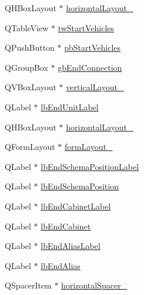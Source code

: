 \begin{DoxyCompactItemize}
\item 
Q\-H\-Box\-Layout $\ast$ \hyperlink{class_ui__mdt_cl_unit_link_dialog_a83f86965ec189685c8fa610371be4cdf}{horizontal\-Layout\-\_}
\item 
Q\-Table\-View $\ast$ \hyperlink{class_ui__mdt_cl_unit_link_dialog_a1a12761bd3b7fb3d574e790013e29267}{tw\-Start\-Vehicles}
\item 
Q\-Push\-Button $\ast$ \hyperlink{class_ui__mdt_cl_unit_link_dialog_a76e41cf9a2d85ea9ad0e15d3f0f4ed91}{pb\-Start\-Vehicles}
\item 
Q\-Group\-Box $\ast$ \hyperlink{class_ui__mdt_cl_unit_link_dialog_a5e6c24c5ad56b20b8289749c906ccc65}{gb\-End\-Connection}
\item 
Q\-V\-Box\-Layout $\ast$ \hyperlink{class_ui__mdt_cl_unit_link_dialog_a8b2ec4702b83c9892c0b1feff9513c28}{vertical\-Layout\-\_}
\item 
Q\-Label $\ast$ \hyperlink{class_ui__mdt_cl_unit_link_dialog_a4bbab7bc9ce1d4b4e04ae075a2e08a43}{lb\-End\-Unit\-Label}
\item 
Q\-H\-Box\-Layout $\ast$ \hyperlink{class_ui__mdt_cl_unit_link_dialog_a1e7a1e276f9f01e0f25f46d7bfe7e8f9}{horizontal\-Layout\-\_}
\item 
Q\-Form\-Layout $\ast$ \hyperlink{class_ui__mdt_cl_unit_link_dialog_afbcb186f7a974287674edfccdbbb06b3}{form\-Layout\-\_}
\item 
Q\-Label $\ast$ \hyperlink{class_ui__mdt_cl_unit_link_dialog_a3c5c9794fa6c0ecdc61860ed39525f81}{lb\-End\-Schema\-Position\-Label}
\item 
Q\-Label $\ast$ \hyperlink{class_ui__mdt_cl_unit_link_dialog_ab5c0df8c3acbb95824f42463c3c6a1fb}{lb\-End\-Schema\-Position}
\item 
Q\-Label $\ast$ \hyperlink{class_ui__mdt_cl_unit_link_dialog_afe972daff82047d4467c1107be8ebb9b}{lb\-End\-Cabinet\-Label}
\item 
Q\-Label $\ast$ \hyperlink{class_ui__mdt_cl_unit_link_dialog_a945d4c2d44bc0de5d98b539d75ae4a94}{lb\-End\-Cabinet}
\item 
Q\-Label $\ast$ \hyperlink{class_ui__mdt_cl_unit_link_dialog_ae81ebd01898411658d617b8521177204}{lb\-End\-Alias\-Label}
\item 
Q\-Label $\ast$ \hyperlink{class_ui__mdt_cl_unit_link_dialog_a48451594b62653e9e971b4f914b01c03}{lb\-End\-Alias}
\item 
Q\-Spacer\-Item $\ast$ \hyperlink{class_ui__mdt_cl_unit_link_dialog_a9ca028e3363657d92a0d21113f436745}{horizontal\-Spacer\-\_}
\item 

\end{DoxyCompactItemize}

